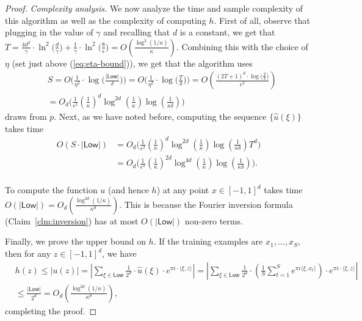 \begin{proof}
\emph{Complexity analysis.}
We now analyze the time and sample complexity of this algorithm as well as the complexity of computing $h$. First of all, observe that plugging in the value of $\gamma$ and recalling that $d$ is a constant, we get that $T  = 
\frac{4d^2}{\gamma} \cdot \ln^2 \bigg(\frac{d}{\gamma}\bigg) + \frac{1}{\gamma} \cdot \ln^2 \bigg( \frac{8 }{\epsilon}\bigg)
 =
O\left({\frac {\log^2(1/\kappa)}{\kappa}}\right)$. Combining this with the choice of $\eta$ (set just above (\ref{eq:eta-bound})),  we get that the algorithm uses
\begin{align*}
& S = O\bigg( \frac{1}{\eta^2} \cdot \log \bigg(\frac{|\mathsf{Low}|}{\delta} \bigg) \bigg) 
= O\bigg( \frac{1}{\eta^2} \cdot \log \bigg(\frac{T}{\delta} \bigg) \bigg) 
= O\left( \frac{(2 T + 1)^d \cdot \log \bigg(\frac{T}{\delta} \bigg)}{\epsilon^2} \right)  \\
& = O_{d}\bigg( \frac{1}{\epsilon^2}
          \left( \frac{1}{\kappa} \right)^d
          \log^{2d} \left( \frac{1}{\kappa} \right)
          \log \left( \frac{1}{\kappa \delta} \right)\bigg) 
\end{align*}
draws from $p$.
Next, as we have noted before, computing the sequence $\{\widehat{u}(\xi)\}$ takes time 
\begin{align*}
O(S \cdot |\mathsf{Low}|)
  & = O_{d}\bigg( \frac{1}{\epsilon^2}
          \left( \frac{1}{\kappa} \right)^d
          \log^{2d} \left( \frac{1}{\kappa} \right)
          \log \left( \frac{1}{\kappa \delta} \right) T^d \bigg) 
     \\
  & = O_{d}\bigg( \frac{1}{\epsilon^2}
          \left( \frac{1}{\kappa} \right)^{2 d}
          \log^{4 d} \left( \frac{1}{\kappa} \right)
          \log \left( \frac{1}{\kappa \delta} \right) \bigg). \\
\end{align*}


To compute the function $u$ (and hence $h$) at any point $x \in
[-1,1]^d$ takes time
$O(|\mathsf{Low}|) = 
  O_{d} \left( {\frac {\log^{2d}
      (1/\kappa)}{\kappa^d}} \right).$ This is because
the Fourier inversion formula (Claim~\ref{clm:inversion}) has at most
$O(|\mathsf{Low}|)$ non-zero terms.

Finally, we prove the upper bound on $h$.  
If the training examples are $x_1,...,x_S$, then
for any $z \in [-1,1]^d$, we have
\begin{align*}
& h(z) \leq | u(z) |
     = \left| \sum_{\xi \in \mathsf{Low}} \frac{1}{2^d} \cdot \hat{u} (\xi) \cdot e^{ \pi i \cdot \langle \xi, z \rangle} \right|
     = \left| \sum_{\xi \in \mathsf{Low}} \frac{1}{2^d} \cdot 
     \left( \frac{1}{S} \sum_{t=1}^S e^{\pi i \langle \xi, x_t \rangle} 
       \right)
         \cdot e^{ \pi i \cdot \langle \xi, z \rangle} \right| \\
&      \leq \frac{|\mathsf{Low}|}{2^d} 
    =  O_{d} \left( {\frac {\log^{2d} (1/\kappa)}{\kappa^d}} \right),
\end{align*}
completing the proof.
\end{proof}



